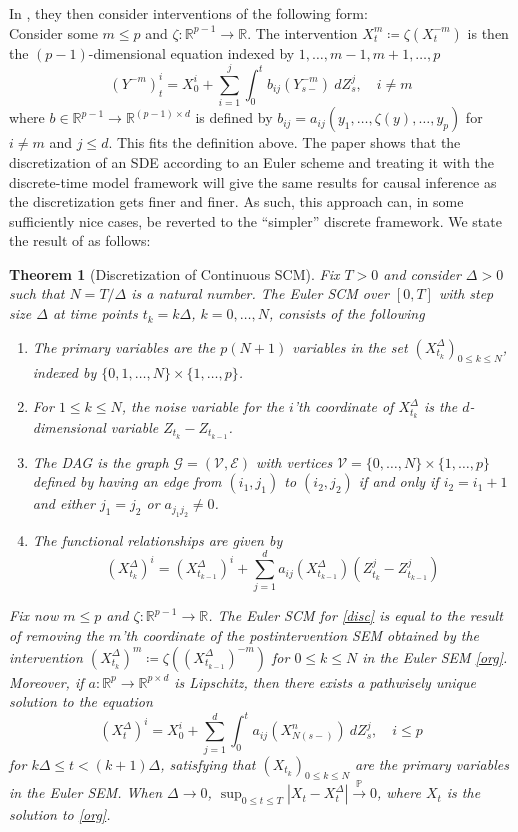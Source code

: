 \documentclass[11pt, a4paper]{memoir}
\theoremstyle{break}
\newtheorem{thm}{Theorem}
\theoremstyle{break}
\theoremstyle{nonumberplain}
\newcommand{\mR}{\mathbb{R}}
\newcommand{\mP}{\mathbb{P}}
\begin{document}
In \cite{sokol2014}, they then consider interventions of the following form:\\[5pt]
Consider some $m\leqslant p$ and $\zeta:\mR^{p-1}\to\mR$. The intervention $X_t^m\coloneqq \zeta(X_t^{-m})$ is then the $(p-1)$-dimensional equation indexed by $1,\ldots,m-1,m+1,\ldots,p$
\begin{equation}\label{disc}
(Y^{-m})_t^i=X_0^i+\sum_{i=1}^j \int_0^t b_{ij}(Y_{s-}^{-m})\ dZ_s^j,\quad i\neq m
\end{equation}
where $b\in \mR^{p-1}\to \mR^{(p-1)\times d}$ is defined by $b_{ij}=a_{ij}(y_1,\ldots,\zeta(y),\ldots,y_p)$ for $i\neq m$ and $j\leqslant d$. This fits the definition above. The paper shows that the discretization of an SDE according to an Euler scheme and treating it with the discrete-time model framework will give the same results for causal inference as the discretization gets finer and finer. As such, this approach can, in some sufficiently nice cases, be reverted to the \enquote{simpler} discrete framework. We state the result of \cite{sokol2014} as follows:
\begin{thm}[Discretization of Continuous SCM]\label{Discret}
Fix $T>0$ and consider $\Delta >0$ such that $N=T/\Delta$ is a natural number. The Euler SCM over $[0,T]$ with step size $\Delta$ at time points $t_k=k\Delta$, $k=0,\ldots, N$, consists of the following
\begin{enumerate}[label=\roman*)]
	\item The primary variables are the $p(N+1)$ variables in the set $(X^{\Delta}_{t_k})_{0\leqslant k\leqslant N}$, indexed by $\{0,1,\ldots, N\}\times \{1,\ldots ,p\}$.
	\item For $1\leqslant k\leqslant N$, the noise variable for the $i$'th coordinate of $X_{t_k}^{\Delta}$ is the $d$-dimensional variable $Z_{t_k}-Z_{t_{k-1}}$.
	\item The DAG is the graph $\mathcal{G}=(\mathcal{V},\mathcal{E})$ with vertices $\mathcal{V}=\{0,\ldots, N\}\times \{1,\ldots, p\}$ defined by having an edge from $(i_1,j_1)$ to $(i_2,j_2)$ if and only if $i_2=i_1+1$ and either $j_1=j_2$ or $a_{j_1j_2}\neq 0$.
	\item The functional relationships are given by
	$$(X_{t_k}^\Delta)^i=(X_{t_{k-1}}^\Delta)^i+\sum_{j=1}^da_{ij}(X_{t_{k-1}}^{\Delta})(Z_{t_k}^j-Z_{t_{k-1}}^j)$$
\end{enumerate}
Fix now $m\leqslant p$ and $\zeta:\mR^{p-1}\to\mR$. The Euler SCM for \ref{disc} is equal to the result of removing the $m$'th coordinate of the postintervention SEM obtained by the intervention $(X_{t_k}^\Delta)^m\coloneqq \zeta((X_{t_{k-1}}^\Delta)^{-m})$ for $0\leqslant k\leqslant N$ in the Euler SEM \ref{org}.\\[5pt]
Moreover, if $a:\mR^p\to\mR^{p\times d}$ is Lipschitz, then there exists a pathwisely unique solution to the equation 
$$(X^\Delta_t)^i=X_0^i+\sum_{j=1}^d\int_0^t a_{ij}(X^n_{N(s-)})\ dZ_s^j,\quad i\leqslant p$$
for $k\Delta\leqslant t<(k+1)\Delta$, satisfying that $(X_{t_{k}})_{0\leqslant k\leqslant N}$ are the primary variables in the Euler SEM. When $\Delta\to 0$, $\sup_{0\leqslant t\leqslant T}|X_t-X_t^{\Delta}|\overset{\mP}{\to}0$, where $X_t$ is the solution to \ref{org}.
\end{thm}
\end{document}
